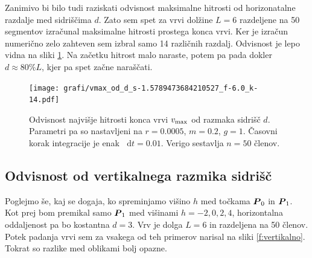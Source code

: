 \documentclass[a4paper, 12pt, slovene]{article}
\newcommand*\diff{\mathop{}\!\mathrm{d}}
\numberwithin{equation}{section}
\newcommand{\bi}[1]{\hbox{\boldmath{$#1$}}}
\begin{document}
Zanimivo bi bilo tudi raziskati odvisnost maksimalne hitrosti od horizonatalne razdalje med sidriščima $d$. Zato sem spet za vrvi dolžine $L=6$ razdeljene na 50 segmentov izračunal maksimalne hitrosti prostega konca vrvi. Ker je izračun numerično zelo zahteven sem izbral samo 14 različnih razdalj. Odvisnost je lepo vidna na sliki \ref{f:vmax}. Na začetku hitrost malo naraste, potem pa pada dokler $d\approx 80\% L$, kjer pa spet začne naraščati.

\begin{figure}[H]
\centering
\texttt{[image: grafi/vmax\_od\_d\_s-1.5789473684210527\_f-6.0\_k-14.pdf]}
\caption{Odvisnost najvišje hitrosti konca vrvi $v_{\rm{max}}$ od razmaka sidrišč $d$. Parametri pa so nastavljeni na $r=0.0005$, $m=0.2$, $g=1$. Časovni korak integracije je enak $\diff t = 0.01$. Verigo sestavlja $n=50$ členov.}
\label{f:vmax}
\end{figure}





\subsection{Odvisnost od vertikalnega razmika sidrišč}
Poglejmo še, kaj se dogaja, ko spreminjamo višino $h$ med točkama ${\bi P_0}$ in ${\bi P_1}$. Kot prej bom premikal samo ${\bi P_1}$ med višinami $h = -2, 0, 2, 4$, horizontalna oddaljenost pa bo kostantna $d=3$. Vrv je dolga $L=6$ in razdeljena na 50 členov. Potek padanja vrvi sem za vsakega od teh primerov narisal na sliki \ref{f:vertikalno}. Tokrat so razlike med oblikami bolj opazne.
\end{document}
